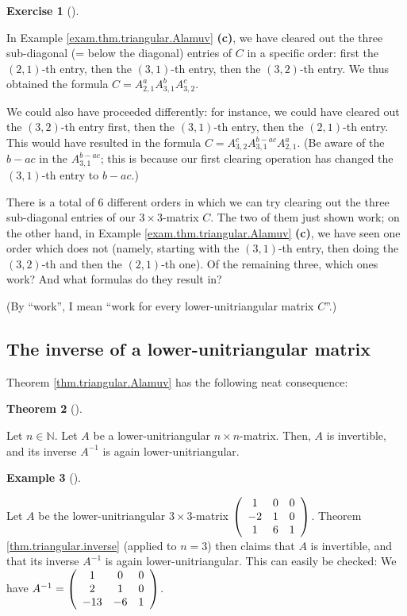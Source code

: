 \documentclass[numbers=enddot,12pt,final,onecolumn,notitlepage]{scrartcl}%
\theoremstyle{definition}
\newtheorem{theo}{Theorem}[section]
\newenvironment{theorem}[1][]
{\begin{theo}[#1]\begin{leftbar}}
{\end{leftbar}\end{theo}}
\newtheorem{exam}[theo]{Example}
\newenvironment{example}[1][]
{\begin{exam}[#1]\begin{leftbar}}
{\end{leftbar}\end{exam}}
\newtheorem{exmp}[theo]{Exercise}
\newenvironment{exercise}[1][]
{\begin{exmp}[#1]\begin{leftbar}}
{\end{leftbar}\end{exmp}}
\begin{document}
\begin{exercise}
In Example \ref{exam.thm.triangular.Alamuv} \textbf{(c)}, we have cleared out
the three sub-diagonal (= below the diagonal) entries of $C$ in a specific
order: first the $\left(  2,1\right)  $-th entry, then the $\left(
3,1\right)  $-th entry, then the $\left(  3,2\right)  $-th entry. We thus
obtained the formula $C=A_{2,1}^{a}A_{3,1}^{b}A_{3,2}^{c}$.

We could also have proceeded differently: for instance, we could have cleared
out the $\left(  3,2\right)  $-th entry first, then the $\left(  3,1\right)
$-th entry, then the $\left(  2,1\right)  $-th entry. This would have resulted
in the formula $C=A_{3,2}^{c}A_{3,1}^{b-ac}A_{2,1}^{a}$. (Be aware of the
$b-ac$ in the $A_{3,1}^{b-ac}$; this is because our first clearing operation
has changed the $\left(  3,1\right)  $-th entry to $b-ac$.)

There is a total of $6$ different orders in which we can try clearing out the
three sub-diagonal entries of our $3\times3$-matrix $C$. The two of them just
shown work; on the other hand, in Example \ref{exam.thm.triangular.Alamuv}
\textbf{(c)}, we have seen one order which does not (namely, starting with the
$\left(  3,1\right)  $-th entry, then doing the $\left(  3,2\right)  $-th and
then the $\left(  2,1\right)  $-th one). Of the remaining three, which ones
work? And what formulas do they result in?

(By \textquotedblleft work\textquotedblright, I mean \textquotedblleft work
for every lower-unitriangular matrix $C$\textquotedblright.)
\end{exercise}

\subsection{The inverse of a lower-unitriangular matrix}

Theorem \ref{thm.triangular.Alamuv} has the following neat consequence:

\begin{theorem}
\label{thm.triangular.inverse}Let $n\in\mathbb{N}$. Let $A$ be a
lower-unitriangular $n\times n$-matrix. Then, $A$ is invertible, and its
inverse $A^{-1}$ is again lower-unitriangular.
\end{theorem}

\begin{example}
\label{exam.thm.triangular.inverse}Let $A$ be the lower-unitriangular
$3\times3$-matrix $\left(
\begin{array}
[c]{ccc}%
1 & 0 & 0\\
-2 & 1 & 0\\
1 & 6 & 1
\end{array}
\right)  $. Theorem \ref{thm.triangular.inverse} (applied to $n=3$) then
claims that $A$ is invertible, and that its inverse $A^{-1}$ is again
lower-unitriangular. This can easily be checked: We have $A^{-1}=\left(
\begin{array}
[c]{ccc}%
1 & 0 & 0\\
2 & 1 & 0\\
-13 & -6 & 1
\end{array}
\right)  $.
\end{example}
\end{document}
